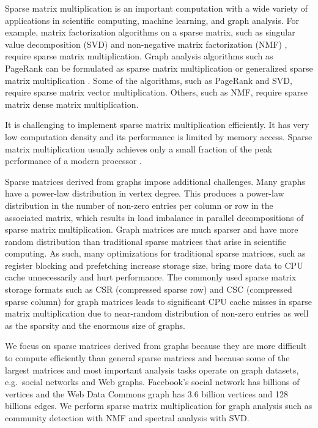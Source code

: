 Sparse matrix multiplication is an important computation with a wide variety
of applications in scientific computing, machine learning, and graph analysis.
For example, matrix factorization algorithms on a sparse matrix, such as
singular value decomposition (SVD) \cite{svd} and non-negative matrix
factorization (NMF) \cite{nmf}, require sparse matrix multiplication.
Graph analysis algorithms such as PageRank \cite{pagerank} can be
formulated as sparse matrix multiplication or generalized sparse matrix
multiplication \cite{Mattson13}. Some of
the algorithms, such as PageRank and SVD, require sparse matrix vector
multiplication. Others, such as NMF, require sparse matrix dense
matrix multiplication.

It is challenging to implement sparse matrix multiplication efficiently. 
It has very low computation density and its
performance is limited by memory access. Sparse matrix multiplication usually achieves only
a small fraction of the peak performance of a modern processor \cite{Williams07}.

Sparse matrices derived from graphs impose additional challenges.
Many graphs have a power-law distribution in vertex
degree.  This produces a power-law distribution in the number of non-zero 
entries per column or row in the associated matrix, which   
results in load imbalance in parallel decompositions of sparse 
matrix multiplication. 
Graph matrices are much sparser and have more random distribution 
than traditional sparse matrices that arise in scientific
computing. As such, many optimizations for traditional sparse matrices, such
as register blocking and prefetching \cite{Williams07} increase storage size,
bring more data to CPU cache unnecessarily and hurt performance.
The commonly used sparse matrix storage formats such as CSR (compressed sparse
row) and CSC (compressed sparse column) for graph matrices leads to significant
CPU cache misses
in sparse matrix multiplication due to near-random distribution of non-zero
entries as well as the sparsity and the enormous size of graphs. 

We focus on sparse matrices derived from graphs because they are more difficult 
to compute efficiently than general sparse matrices and because some of the 
largest matrices and most important analysis tasks operate on graph datasets, 
e.g.~social networks and Web graphs. 
Facebook's social network has billions of vertices and
the Web Data Commons graph \cite{web_graph} has 3.6 billion vertices and 128
billions edges. We perform sparse matrix multiplication for graph
analysis such as community detection with NMF and spectral analysis with SVD.

